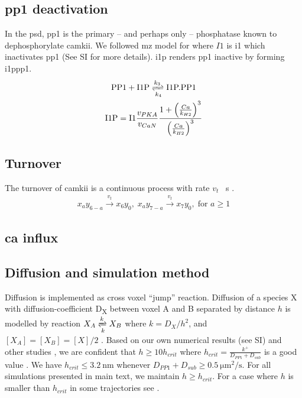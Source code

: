 \documentclass[9pt,lineno,doublespacing]{elife}
\newcommand\SUB[2]{#1\textsubscript{#2}}
\begin{document}
{\subsection{\gls{pp1} deactivation}\label{subsec:pp1_deactivation} 
In the \gls{psd}, \gls{pp1} is the primary -- and perhaps only -- phosphatase known to
dephosphorylate \gls{camkii}\citep{strack_translocation_1997}.  We followed
\gls{mz} model for  where $I1$ is \gls{i1} which inactivates
\gls{pp1} (See SI for more details). \Gls{i1p} renders \gls{pp1} inactive by
forming \gls{i1ppp1}. 
\begin{equation}\label{eq:i1pandpp1}
    \begin{gathered}
        \text{PP1} + \text{I1P} \xrightleftharpoons[k_4]{k_3} \text{I1P.PP1} \\
        \text{I1P} = \text{I1} \frac{v_{PKA}}{v_{CaN}} 
            \frac{1+\left(\frac{Ca}{k_{H2}}\right)^3}{\left(\frac{Ca}{k_{H2}}\right)^3}
    \end{gathered}
\end{equation}

\subsection{Turnover}\label{turnover}
The turnover of \gls{camkii} is a continuous process with rate
$v_{t}$ \si{\per\second} .
\begin{equation} \label{eq:turnover}
    \begin{gathered}
        x_ay_{6-a} \xrightarrow{v_t} x_6y_0,\;
        x_ay_{7-a} \xrightarrow{v_t} x_7y_0,\; \text{for } a \ge 1
    \end{gathered}
\end{equation}

\subsection{\gls{ca} influx}


\subsection{Diffusion and simulation method}\label{subsec:simulator}
Diffusion is implemented as cross voxel ``jump'' reaction. Diffusion of a
species X with diffusion-coefficient \SUB{D}{X} between voxel A and B separated
by distance $h$ is modelled by reaction $X_A \xrightleftharpoons[k]{k} X_B$
where \( k={D_X}/{h^2}\), and \([X_A]=[X_B]=[X]/2 \)
\citep{erban_practical_2007}.  Based on our own numerical results (see SI) and
other studies \citep{isaacson_reaction-diffusion_2009,erban_stochastic_2009}, we
are confident that \( h \ge 10h_{crit}\) where
\(h_{crit}=\frac{k^+}{D_{PP1}+D_{sub}}\) is a good value
\citep{erban_stochastic_2009}.  We have \( h_{crit} \le \SI{3.2}{\nano\meter} \)
whenever $D_{PP1}+D_{sub}\ge\SI{0.5}{\micro\meter\squared\per\second}$. For all
simulations presented in main text, we maintain $h\ge h_{crit}$.  For a case
where $h$ is smaller than $h_{crit}$ in some trajectories see
. 

}
\end{document}

